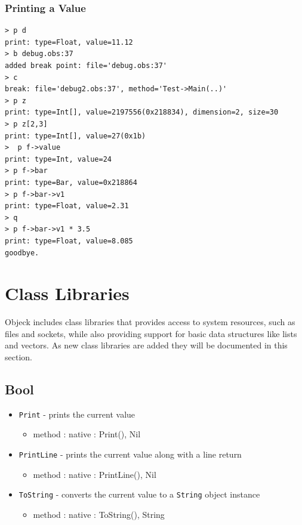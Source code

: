 \documentclass[12pt]{article}
\begin{document}
\subsubsection{Printing a Value}
\begin{verbatim}
> p d
print: type=Float, value=11.12
> b debug.obs:37
added break point: file='debug.obs:37'
> c
break: file='debug2.obs:37', method='Test->Main(..)'
> p z
print: type=Int[], value=2197556(0x218834), dimension=2, size=30
> p z[2,3]
print: type=Int[], value=27(0x1b)
>  p f->value
print: type=Int, value=24
> p f->bar
print: type=Bar, value=0x218864
> p f->bar->v1
print: type=Float, value=2.31
> q
> p f->bar->v1 * 3.5
print: type=Float, value=8.085
goodbye.
\end{verbatim}

\section{Class Libraries}
Objeck includes class libraries that provides access to system resources, such as files and sockets, while also providing support for  basic data structures like lists and vectors.  As new class libraries are added they will be documented in this section.

\subsection{Bool}
\begin{itemize}
    \item \texttt{Print} - prints the current value
    	\begin{itemize}
	\item method : native : Print(), Nil
	\end{itemize}
    \item \texttt{PrintLine} - prints the current value along with a line return
    	\begin{itemize}
	\item method : native : PrintLine(), Nil
	\end{itemize}
    \item \texttt{ToString} - converts the current value to a \texttt{String} object instance
   	\begin{itemize}
	\item method : native : ToString(), String
	\end{itemize}
\end{itemize}
\end{document}
